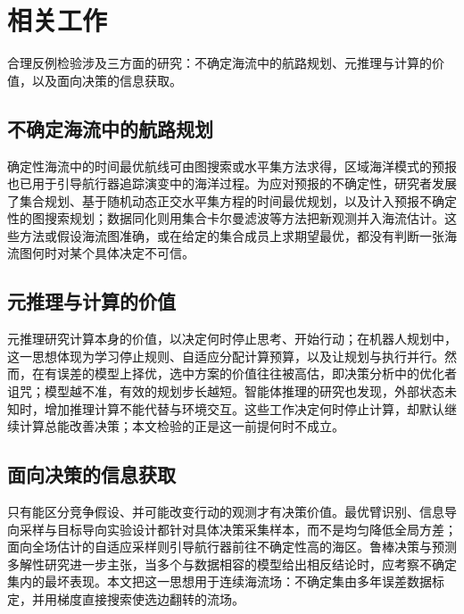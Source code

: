 \section{相关工作}
\label{sec:related}

合理反例检验涉及三方面的研究：不确定海流中的航路规划、元推理与计算的价值，以及面向决策的信息获取。

\subsection{不确定海流中的航路规划}
确定性海流中的时间最优航线可由图搜索或水平集方法求得\cite{dijkstra1959note,lolla2014levelset}，区域海洋模式的预报也已用于引导航行器追踪演变中的海洋过程\cite{smith2010planning}。为应对预报的不确定性，研究者发展了集合规划\cite{wang2016path}、基于随机动态正交水平集方程的时间最优规划\cite{subramani2018stochastic}，以及计入预报不确定性的图搜索规划\cite{kularatne2018forecast}；数据同化则用集合卡尔曼滤波等方法把新观测并入海流估计\cite{anderson2001eakf}。这些方法或假设海流图准确，或在给定的集合成员上求期望最优，都没有判断一张海流图何时对某个具体决定不可信。

\subsection{元推理与计算的价值}
元推理研究计算本身的价值，以决定何时停止思考、开始行动\cite{horvitz1987reasoning,russell1991right}；在机器人规划中，这一思想体现为学习停止规则、自适应分配计算预算，以及让规划与执行并行\cite{xiao2020thinking,sung2021quit,lin2015metareasoning,elboher2023formal,magnino2026metareasoning}。然而，在有误差的模型上择优，选中方案的价值往往被高估，即决策分析中的优化者诅咒\cite{smith2006curse}；模型越不准，有效的规划步长越短\cite{jiang2015horizon}。智能体推理的研究也发现，外部状态未知时，增加推理计算不能代替与环境交互\cite{hunt2021formalizing,shen2025thinking,kobalczyk2025active,cuadron2025overthinking}。这些工作决定何时停止计算，却默认继续计算总能改善决策；本文检验的正是这一前提何时不成立。

\subsection{面向决策的信息获取}
只有能区分竞争假设、并可能改变行动的观测才有决策价值\cite{chernoff1959sequential,box1967discrimination}。最优臂识别、信息导向采样与目标导向实验设计都针对具体决策采集样本，而不是均匀降低全局方差\cite{garivier2016optimal,russo2018thompson,russo2018ids,attia2018goal}；面向全场估计的自适应采样则引导航行器前往不确定性高的海区\cite{srinivas2012gpucb,hollinger2014sampling,fossum2019}。鲁棒决策与预测多解性研究进一步主张，当多个与数据相容的模型给出相反结论时，应考察不确定集内的最坏表现\cite{benhaim2006infogap,marx2020predictive}。本文把这一思想用于连续海流场：不确定集由多年误差数据标定，并用梯度直接搜索使选边翻转的流场。

